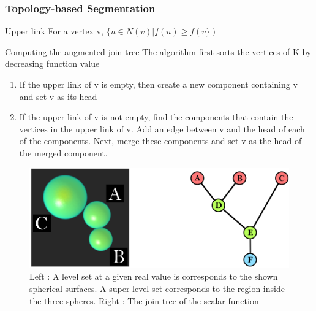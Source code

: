 \documentclass[9pt]{beamer}
\begin{document}
\begin{frame}
\frametitle{Topology-based Segmentation}
\begin{block}{Upper link}
For a vertex v, $\{u \in N(v) |f(u)\geq f(v\})$
\end{block}
\begin{block}{Computing the augmented join tree}
The algorithm first sorts the vertices of K by decreasing function value
\begin{enumerate}
\item If the upper link of v is empty, then create a new component containing v and set v as its head
\item If the upper link of v is not empty, find the components that contain the vertices in the upper link of v. Add an edge between v and the head of each of the components. Next, merge these components and set v as the head of the merged component.
\end{enumerate}
\end{block}
\begin{figure}
\includegraphics[scale=0.15]{Images/join_tree}
\caption{Left : A level set at a given real value is corresponds to the shown spherical surfaces. A super-level set corresponds to the region inside the three spheres. Right : The join tree of the scalar function}
\end{figure}
\end{frame}
\end{document}
